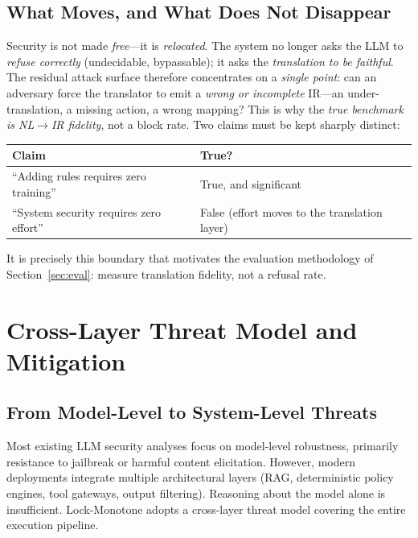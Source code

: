 \documentclass[conference]{IEEEtran}
\begin{document}
\subsection{What Moves, and What Does Not Disappear}
Security is not made \emph{free}---it is \emph{relocated}. The system no
longer asks the LLM to \emph{refuse correctly} (undecidable, bypassable);
it asks the \emph{translation to be faithful}. The residual attack surface
therefore concentrates on a \emph{single point}: can an adversary force the
translator to emit a \emph{wrong or incomplete} IR---an under-translation,
a missing action, a wrong mapping? This is why the \emph{true benchmark is
NL$\rightarrow$IR fidelity}, not a block rate. Two claims must be kept
sharply distinct:
\begin{table}[h]
\centering
\begin{tabular}{@{}p{}l@{}}
\toprule
\textbf{Claim} & \textbf{True?} \\
\midrule
``Adding rules requires zero training'' & True, and significant \\
``System security requires zero effort'' & False (effort moves to the
translation layer) \\
\bottomrule
\end{tabular}
\end{table}
It is precisely this boundary that motivates the evaluation methodology of
Section~\ref{sec:eval}: measure translation fidelity, not a refusal rate.

\section{Cross-Layer Threat Model and Mitigation}
\label{sec:cross-layer}

\subsection{From Model-Level to System-Level Threats}
Most existing LLM security analyses focus on model-level robustness,
primarily resistance to jailbreak or harmful content elicitation. However,
modern deployments integrate multiple architectural layers (RAG,
deterministic policy engines, tool gateways, output filtering). Reasoning
about the model alone is insufficient. Lock-Monotone adopts a cross-layer
threat model covering the entire execution pipeline.
\end{document}
